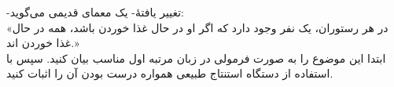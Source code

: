 -تغییر یافتهٔ- یک معمای قدیمی می‌گوید:\\
«در هر رستوران، یک نفر وجود دارد که اگر او در حال غذا خوردن باشد، همه در حال غذا خوردن اند.»\\
ابتدا این موضوع را به صورت فرمولی در زبان مرتبه اول مناسب بیان کنید. سپس با استفاده از دستگاه استنتاج طبیعی همواره درست بودن آن را اثبات کنید.\\
